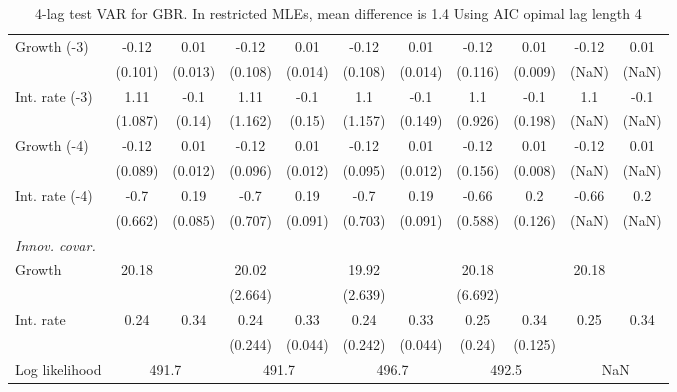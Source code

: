 \begin{table}[htbp]
\begin{tabular}{@{\extracolsep{4pt}}lcccccccccc@{}}
\quad Growth (-3) 	 &-0.12 	 & 0.01 	 & -0.12 	 & 0.01 	 & -0.12 	 & 0.01 	 & -0.12 	 & 0.01 	 & -0.12 	 & 0.01	 \\ 
 		 & (0.101) 	 & (0.013) 	 & (0.108) 	 & (0.014) 	 & (0.108) 	 & (0.014) 	 & (0.116) 	 & (0.009) 	 & (NaN) 	 & (NaN) 	 \\ 
\quad Int. rate (-3) 	 &1.11 	 & -0.1 	 & 1.11 	 & -0.1 	 & 1.1 	 & -0.1 	 & 1.1 	 & -0.1 	 & 1.1 	 & -0.1	 \\ 
 		 & (1.087) 	 & (0.14) 	 & (1.162) 	 & (0.15) 	 & (1.157) 	 & (0.149) 	 & (0.926) 	 & (0.198) 	 & (NaN) 	 & (NaN) 	 \\ 
\quad Growth (-4) 	 &-0.12 	 & 0.01 	 & -0.12 	 & 0.01 	 & -0.12 	 & 0.01 	 & -0.12 	 & 0.01 	 & -0.12 	 & 0.01	 \\ 
 		 & (0.089) 	 & (0.012) 	 & (0.096) 	 & (0.012) 	 & (0.095) 	 & (0.012) 	 & (0.156) 	 & (0.008) 	 & (NaN) 	 & (NaN) 	 \\ 
\quad Int. rate (-4) 	 &-0.7 	 & 0.19 	 & -0.7 	 & 0.19 	 & -0.7 	 & 0.19 	 & -0.66 	 & 0.2 	 & -0.66 	 & 0.2	 \\ 
 		 & (0.662) 	 & (0.085) 	 & (0.707) 	 & (0.091) 	 & (0.703) 	 & (0.091) 	 & (0.588) 	 & (0.126) 	 & (NaN) 	 & (NaN) 	 \\ 
\rule{0pt}{4ex} \emph{Innov. covar.}  	 & 	 & 	 & 	 & 	 & 	 & 	 & 	 & 	 & 	 &\\ 
\quad Growth 	 &20.18 	 &  	 & 20.02 	 &  	 & 19.92 	 &  	 & 20.18 	 &  	 & 20.18 	 & 	 \\ 
 		 &  	 &  	 & (2.664) 	 &  	 & (2.639) 	 &  	 & (6.692) 	 &  	 &  	 &  	 \\ 
\quad Int. rate 	 &0.24 	 & 0.34 	 & 0.24 	 & 0.33 	 & 0.24 	 & 0.33 	 & 0.25 	 & 0.34 	 & 0.25 	 & 0.34	 \\ 
 		 &  	 &  	 & (0.244) 	 & (0.044) 	 & (0.242) 	 & (0.044) 	 & (0.24) 	 & (0.125) 	 &  	 &  	 \\ 
 \hline \rule{0pt}{4ex} 
  Log likelihood 	 &\multicolumn{2}{c}{491.7} 	 & \multicolumn{2}{c}{491.7} 	 & \multicolumn{2}{c}{496.7} 	 & \multicolumn{2}{c}{492.5} 	 & \multicolumn{2}{c}{NaN}\\ 

 \hline 	\end{tabular}		\caption{4-lag test VAR for GBR. In restricted MLEs, mean difference is 1.4 Using AIC opimal lag length 4}
		\label{tab:GBRopt_}

\end{table}